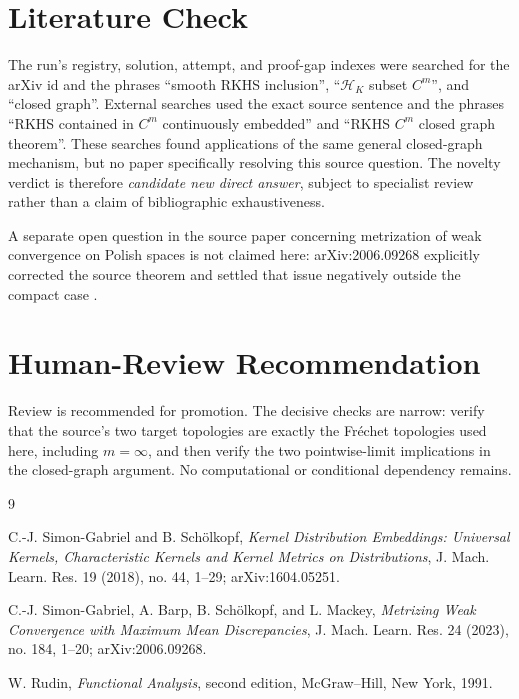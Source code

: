 \documentclass[11pt]{article}
\begin{document}
\section*{Literature Check}

The run's registry, solution, attempt, and proof-gap indexes were searched for
the arXiv id and the phrases ``smooth RKHS inclusion'', ``$\mathcal H_K$
subset $C^m$'', and ``closed graph''.  External searches used the exact source
sentence and the phrases ``RKHS contained in $C^m$ continuously embedded'' and
``RKHS $C^m$ closed graph theorem''.  These searches found applications of the
same general closed-graph mechanism, but no paper specifically resolving this
source question.  The novelty verdict is therefore \emph{candidate new direct
answer}, subject to specialist review rather than a claim of bibliographic
exhaustiveness.

A separate open question in the source paper concerning metrization of weak
convergence on Polish spaces is not claimed here: arXiv:2006.09268 explicitly
corrected the source theorem and settled that issue negatively outside the
compact case \cite{SimonGabrielEtAl}.

\section*{Human-Review Recommendation}

Review is recommended for promotion.  The decisive checks are narrow: verify
that the source's two target topologies are exactly the Fr\'echet topologies
used here, including $m=\infty$, and then verify the two pointwise-limit
implications in the closed-graph argument.  No computational or conditional
dependency remains.

\begin{thebibliography}{9}

C.-J. Simon-Gabriel and B. Sch\"olkopf,
\emph{Kernel Distribution Embeddings: Universal Kernels, Characteristic
Kernels and Kernel Metrics on Distributions},
J. Mach. Learn. Res. 19 (2018), no. 44, 1--29;
arXiv:1604.05251.

C.-J. Simon-Gabriel, A. Barp, B. Sch\"olkopf, and L. Mackey,
\emph{Metrizing Weak Convergence with Maximum Mean Discrepancies},
J. Mach. Learn. Res. 24 (2023), no. 184, 1--20;
arXiv:2006.09268.

W. Rudin,
\emph{Functional Analysis}, second edition,
McGraw--Hill, New York, 1991.

\end{thebibliography}
\end{document}
